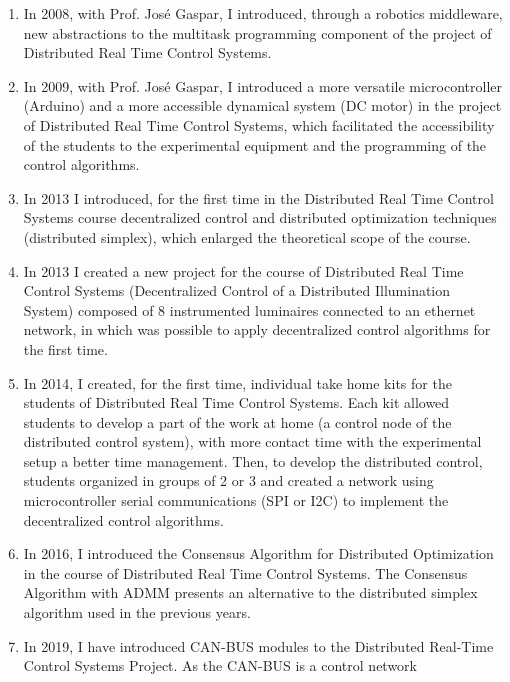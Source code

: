 \documentclass[
]{article}
\begin{document}
\begin{enumerate}
  of Modelling, Identification and Digital Control, for the control of a
  flexible bar. Also, I prepared with Prof. João Miranda Lemos a new
  project for the course on State-Space Control on designing optimal
  controllers and observers for the flexible bar kit.
\item
  In 2008, with Prof. José Gaspar, I introduced, through a robotics
  middleware, new abstractions to the multitask programming component of
  the project of Distributed Real Time Control Systems.
\item
  In 2009, with Prof. José Gaspar, I introduced a more versatile
  microcontroller (Arduino) and a more accessible dynamical system (DC
  motor) in the project of Distributed Real Time Control Systems, which
  facilitated the accessibility of the students to the experimental
  equipment and the programming of the control algorithms.
\item
  In 2013 I introduced, for the first time in the Distributed Real Time
  Control Systems course decentralized control and distributed
  optimization techniques (distributed simplex), which enlarged the
  theoretical scope of the course.
\item
  In 2013 I created a new project for the course of Distributed Real
  Time Control Systems (Decentralized Control of a Distributed
  Illumination System) composed of 8 instrumented luminaires connected
  to an ethernet network, in which was possible to apply decentralized
  control algorithms for the first time.
\item
  In 2014, I created, for the first time, individual take home kits for
  the students of Distributed Real Time Control Systems. Each kit
  allowed students to develop a part of the work at home (a control node
  of the distributed control system), with more contact time with the
  experimental setup a better time management. Then, to develop the
  distributed control, students organized in groups of 2 or 3 and
  created a network using microcontroller serial communications (SPI or
  I2C) to implement the decentralized control algorithms.
\item
  In 2016, I introduced the Consensus Algorithm for Distributed
  Optimization in the course of Distributed Real Time Control Systems.
  The Consensus Algorithm with ADMM presents an alternative to the
  distributed simplex algorithm used in the previous years.
\item
  In 2019, I have introduced CAN-BUS modules to the Distributed
  Real-Time Control Systems Project. As the CAN-BUS is a control network

\end{enumerate}
\end{document}
